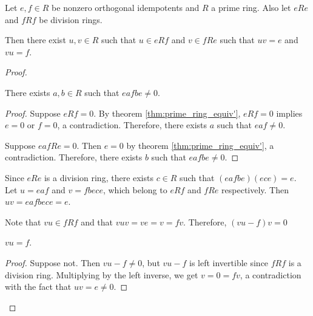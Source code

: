 \begin{theorem}
  \label{thm:orthogonal_idempotents_division_ring}
  \leanok
  Let $e, f \in R$ be nonzero orthogonal idempotents and $R$ a prime ring. Also let $eRe$ and $fRf$ be division rings.

  Then there exist $u, v \in R$ such that $u \in eRf$ and $v \in fRe$ such that $uv = e$ and $vu = f$.
\end{theorem}
\begin{proof}
  \leanok
  \begin{claim}
    There exists $a, b \in R$ such that $eafbe \neq 0$.
  \end{claim}
  \begin{proof}
    \leanok
    Suppose $eRf = 0$. By theorem \ref{thm:prime_ring_equiv'}, $eRf = 0$ implies $e = 0$ or $f = 0$, a contradiction. Therefore, there exists $a$ such that $eaf \neq 0$.

    Suppose $eafRe = 0$. Then $e = 0$ by theorem \ref{thm:prime_ring_equiv'}, a contradiction. Therefore, there exists $b$ such that $eafbe \neq 0$.
  \end{proof}
  Since $eRe$ is a division ring, there exists $c \in R$ such that $(eafbe)(ece) = e$. Let $u = eaf$ and $v = fbece$, which belong to $eRf$ and $fRe$ respectively. Then $uv = eafbece = e$.

  Note that $vu \in fRf$ and that $vuv = ve = v = fv$. Therefore, $(vu - f) v = 0$
  \begin{claim}
    $vu = f$.
  \end{claim}
  \begin{proof}
    \leanok
    Suppose not. Then $vu - f \neq 0$, but $vu - f$ is left invertible since $fRf$ is a division ring. Multiplying by the left inverse, we get $v = 0 = fv$, a contradiction with the fact that $uv = e \neq 0$.
  \end{proof}
\end{proof}

